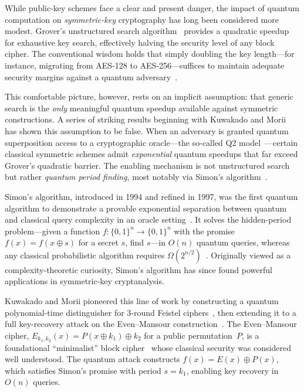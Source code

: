 \documentclass[11pt,a4paper]{article}
\begin{document}
While public-key schemes face a clear and present danger, the impact of
quantum computation on \emph{symmetric-key} cryptography has long been
considered more modest.  Grover's unstructured search
algorithm~\cite{Grover1996} provides a quadratic speedup for exhaustive
key search, effectively halving the security level of any block cipher.
The conventional wisdom holds that simply doubling the key length---for
instance, migrating from AES-128 to AES-256---suffices to maintain
adequate security margins against a quantum
adversary~\cite{NIST_PQC2024, Bernstein2009}.

This comfortable picture, however, rests on an implicit assumption: that
generic search is the \emph{only} meaningful quantum speedup available
against symmetric constructions.  A series of striking results beginning
with Kuwakado and Morii~\cite{Kuwakado2010, Kuwakado2012} has shown this
assumption to be false.  When an adversary is granted quantum
superposition access to a cryptographic oracle---the so-called Q2
model~\cite{BonehZhandry2013, Gagliardoni2016}---certain classical
symmetric schemes admit \emph{exponential} quantum speedups that far
exceed Grover's quadratic barrier.  The enabling mechanism is not
unstructured search but rather \emph{quantum period finding}, most
notably via Simon's algorithm~\cite{Simon1997}.

Simon's algorithm, introduced in 1994 and refined in 1997, was the first
quantum algorithm to demonstrate a provable exponential separation
between quantum and classical query complexity in an oracle
setting~\cite{Simon1997}.  It solves the hidden-period problem---given a
function $f:\{0,1\}^n\to\{0,1\}^n$ with the promise $f(x) = f(x \oplus
s)$ for a secret $s$, find $s$---in $O(n)$ quantum queries, whereas any
classical probabilistic algorithm requires
$\Omega(2^{n/2})$~\cite{Simon1997}.  Originally viewed as a
complexity-theoretic curiosity, Simon's algorithm has since found
powerful applications in symmetric-key cryptanalysis.

Kuwakado and Morii pioneered this line of work by constructing a quantum
polynomial-time distinguisher for 3-round Feistel ciphers~\cite{Kuwakado2010},
then extending it to a full key-recovery attack on the Even--Mansour
construction~\cite{Kuwakado2012}.  The Even--Mansour cipher,
$E_{k_1,k_2}(x) = P(x \oplus k_1) \oplus k_2$ for a public permutation~$P$,
is a foundational ``minimalist'' block cipher~\cite{EvenMansour1997,
Dunkelman2012} whose classical security was considered well understood.
The quantum attack constructs $f(x)= E(x) \oplus P(x)$, which satisfies
Simon's promise with period $s = k_1$, enabling key recovery in $O(n)$
queries.
\end{document}
